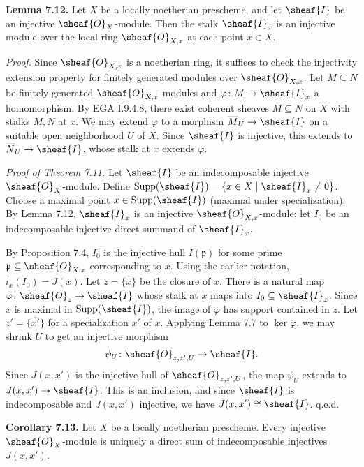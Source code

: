 \setcounter{page}{128}
\textbf{Lemma 7.12.}
Let $X$ be a locally noetherian prescheme, and let $\sheaf{I}$ be an injective $\sheaf{O}_X$-module. Then the stalk $\sheaf{I}_x$ is an injective module over the local ring $\sheaf{O}_{X,x}$ at each point $x\in X$.

\textit{Proof.}
Since $\sheaf{O}_{X,x}$ is a noetherian ring, it suffices to check the injectivity extension property for finitely generated modules over $\sheaf{O}_{X,x}$.
Let $M\subseteq N$ be finitely generated $\sheaf{O}_{X,x}$-modules and $\varphi\colon M\to\sheaf{I}_x$ a homomorphism.
By EGA I.9.4.8, there exist coherent sheaves $\overline{M}\subseteq\overline{N}$ on $X$ with stalks $M,N$ at $x$.
We may extend $\varphi$ to a morphism $\overline{M}_U\to\sheaf{I}$ on a suitable open neighborhood $U$ of $X$.
Since $\sheaf{I}$ is injective, this extends to $\overline{N}_U\to\sheaf{I}$, whose stalk at $x$ extends $\varphi$.

\textit{Proof of Theorem 7.11.}
Let $\sheaf{I}$ be an indecomposable injective $\sheaf{O}_X$-module.
Define $\operatorname{Supp}(\sheaf{I})=\{x\in X\mid \sheaf{I}_x\neq 0\}$.
Choose a maximal point $x\in\operatorname{Supp}(\sheaf{I})$ (maximal under specialization).
By Lemma 7.12, $\sheaf{I}_x$ is an injective $\sheaf{O}_{X,x}$-module;
let $I_0$ be an indecomposable injective direct summand of $\sheaf{I}_x$.

\setcounter{page}{129}
By Proposition 7.4, $I_0$ is the injective hull $I(\mathfrak{p})$ for some prime $\mathfrak{p}\subseteq\sheaf{O}_{X,x}$ corresponding to $x$.
Using the earlier notation, $i_x(I_0)=J(x)$.
Let $z=\overline{\{x\}}$ be the closure of $x$.
There is a natural map $\varphi\colon\sheaf{O}_z\to\sheaf{I}$ whose stalk at $x$ maps into $I_0\subseteq\sheaf{I}_x$.
Since $x$ is maximal in $\operatorname{Supp}(\sheaf{I})$, the image of $\varphi$ has support contained in $z$.
Let $z'=\overline{\{x'\}}$ for a specialization $x'$ of $x$.
Applying Lemma 7.7 to $\ker\varphi$, we may shrink $U$ to get an injective morphism
\[
\psi_U\colon \sheaf{O}_{z,z',U}\to\sheaf{I}.
\]
Since $J(x,x')$ is the injective hull of $\sheaf{O}_{z,z',U}$, the map $\psi_U$ extends to $J(x,x')\to\sheaf{I}$.
This is an inclusion, and since $\sheaf{I}$ is indecomposable and $J(x,x')$ injective, we have $J(x,x')\cong\sheaf{I}$.
q.e.d.

\setcounter{page}{130}
\textbf{Corollary 7.13.}
Let $X$ be a locally noetherian prescheme. Every injective $\sheaf{O}_X$-module is uniquely a direct sum of indecomposable injectives $J(x,x')$.

